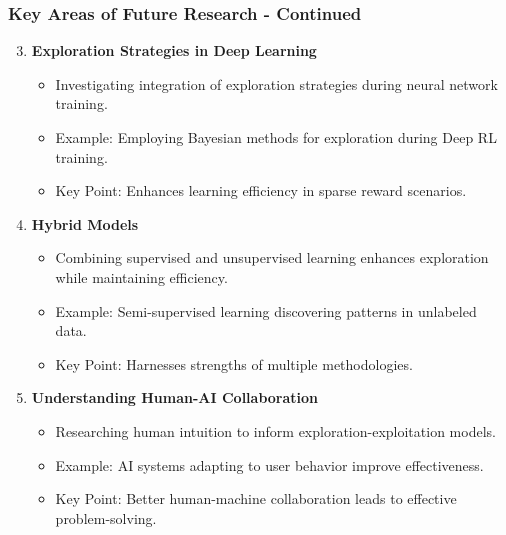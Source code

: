 \documentclass[aspectratio=169]{beamer}
\begin{document}
\begin{frame}[fragile]
    \frametitle{Key Areas of Future Research - Continued}
    \begin{enumerate}
        \setcounter{enumi}{2}
        \item \textbf{Exploration Strategies in Deep Learning}
            \begin{itemize}
                \item Investigating integration of exploration strategies during neural network training.
                \item Example: Employing Bayesian methods for exploration during Deep RL training.
                \item Key Point: Enhances learning efficiency in sparse reward scenarios.
            \end{itemize}

        \item \textbf{Hybrid Models}
            \begin{itemize}
                \item Combining supervised and unsupervised learning enhances exploration while maintaining efficiency.
                \item Example: Semi-supervised learning discovering patterns in unlabeled data.
                \item Key Point: Harnesses strengths of multiple methodologies.
            \end{itemize}

        \item \textbf{Understanding Human-AI Collaboration}
            \begin{itemize}
                \item Researching human intuition to inform exploration-exploitation models.
                \item Example: AI systems adapting to user behavior improve effectiveness.
                \item Key Point: Better human-machine collaboration leads to effective problem-solving.
            \end{itemize}
    \end{enumerate}
\end{frame}
\end{document}
